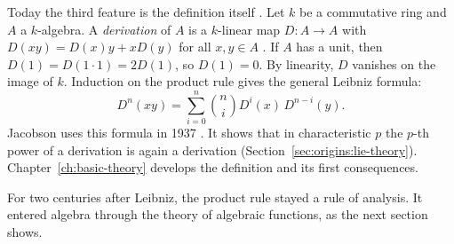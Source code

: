 Today the third feature is the definition itself \cite[p.~467]{Leibniz1684}. Let $k$ be a commutative ring and $A$ a $k$-algebra. A \emph{derivation} of
$A$ is a $k$-linear map $D\colon A \to A$ with $D(xy) = D(x)y + xD(y)$ for all
$x, y \in A$ \cite[p.~206]{Jacobson1937}. If $A$ has a unit, then $D(1) = D(1\cdot 1) = 2D(1)$, so
$D(1) = 0$. By linearity, $D$ vanishes on the image of $k$. Induction on the
product rule gives the general Leibniz formula:
\[
  D^n(xy) = \sum_{i=0}^{n} \binom{n}{i} D^i(x)\, D^{n-i}(y).
\]
Jacobson uses this formula in 1937 \cite[p.~207]{Jacobson1937}. It shows that in characteristic $p$ the
$p$-th power of a derivation is again a derivation
(Section~\ref{sec:origins:lie-theory}). Chapter~\ref{ch:basic-theory}
develops the definition and its first consequences.

For two centuries after Leibniz, the product rule stayed a rule of analysis.
It entered algebra through the theory of algebraic functions, as the next
section shows.

